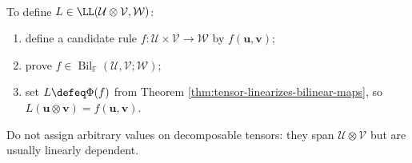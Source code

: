 \begin{method} \label{meth:defining-linear-maps-on-tensor-products} \\
To define $L\in\LL(\mathcal{U}\otimes\mathcal{V},\mathcal{W})$:
\begin{enumerate}[label=(\roman*)]
\setlength{\itemsep}{0pt}
\item define a candidate rule $f:\mathcal{U}\times\mathcal{V}\to\mathcal{W}$ by $f(\mathbf{u},\mathbf{v})$;
\item prove $f\in\operatorname{Bil}_{\mathbb{F}}(\mathcal{U},\mathcal{V};\mathcal{W})$;
\item set $L\defeq\Phi(f)$ from Theorem \ref{thm:tensor-linearizes-bilinear-maps}, so $L(\mathbf{u}\otimes\mathbf{v})=f(\mathbf{u},\mathbf{v})$.
\end{enumerate}
Do not assign arbitrary values on decomposable tensors: they span $\mathcal{U}\otimes\mathcal{V}$ but are usually linearly dependent.
\end{method}
